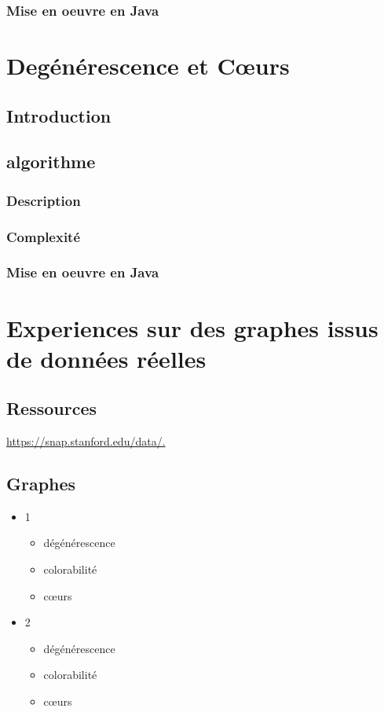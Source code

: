 \documentclass{article}
\begin{document}
\subsubsection{Mise en oeuvre en Java }

\newpage

\section{Degénérescence et Cœurs }
\subsection{Introduction}
\subsection{algorithme}
\subsubsection{Description}
\subsubsection{Complexité}
\subsubsection{Mise en oeuvre en Java }

\newpage

\section{Experiences sur des graphes issus de données réelles }

\subsection{Ressources }
\href{https://snap.stanford.edu/data/.}{https://snap.stanford.edu/data/.}

\subsection{Graphes }
\begin{itemize}
    \item 1
    \begin{itemize}
        \item dégénérescence
        \item colorabilité
        \item cœurs
        \end{itemize}

    \item 2
    \begin{itemize}
        \item dégénérescence
        \item colorabilité
        \item cœurs
    \end{itemize}
\end{itemize}
\end{document}
